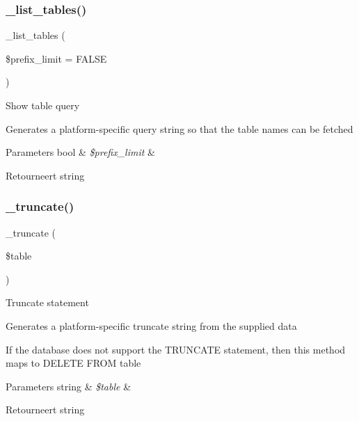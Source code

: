 \subsubsection{\texorpdfstring{\_list\_tables()}{\_list\_tables()}}
{\footnotesize\ttfamily \+\_\+list\+\_\+tables (\begin{DoxyParamCaption}\item[{}]{\$prefix\+\_\+limit = {\ttfamily FALSE} }\end{DoxyParamCaption})\hspace{0.3cm}{\ttfamily [protected]}}

Show table query

Generates a platform-\/specific query string so that the table names can be fetched


\begin{DoxyParams}[1]{Parameters}
bool & {\em \$prefix\+\_\+limit} & \\
\hline
\end{DoxyParams}
\begin{DoxyReturn}{Retourneert}
string 
\end{DoxyReturn}
\mbox{\label{class_c_i___d_b__pdo__informix__driver_aa029600528fc1ce660a23ff4b4667f95}} 
\subsubsection{\texorpdfstring{\_truncate()}{\_truncate()}}
{\footnotesize\ttfamily \+\_\+truncate (\begin{DoxyParamCaption}\item[{}]{\$table }\end{DoxyParamCaption})\hspace{0.3cm}{\ttfamily [protected]}}

Truncate statement

Generates a platform-\/specific truncate string from the supplied data

If the database does not support the T\+R\+U\+N\+C\+A\+TE statement, then this method maps to \textquotesingle{}D\+E\+L\+E\+TE F\+R\+OM table\textquotesingle{}


\begin{DoxyParams}[1]{Parameters}
string & {\em \$table} & \\
\hline
\end{DoxyParams}
\begin{DoxyReturn}{Retourneert}
string 
\end{DoxyReturn}
\mbox{\label{class_c_i___d_b__pdo__informix__driver_a2540b03a93fa73ae74c10d0e16fc073e}} 
